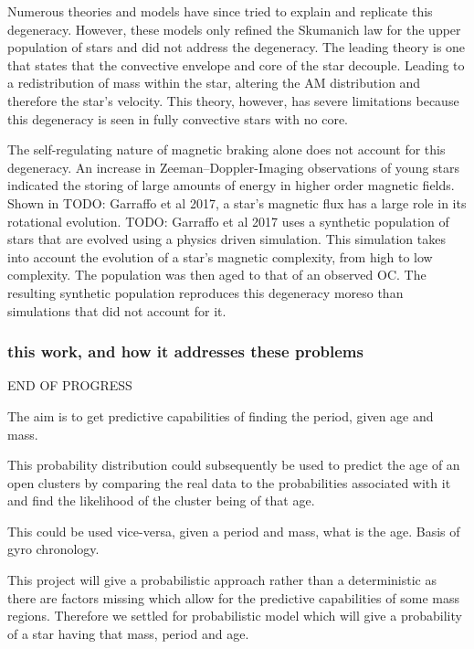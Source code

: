 \documentclass[fleqn,usenatbib]{mnras}
\begin{document}
Numerous theories and models have since tried to explain and replicate this degeneracy.
However, these models only refined the Skumanich law for the upper population of stars and did not address the degeneracy.
The leading theory is one that states that the convective envelope and core of the star decouple.
Leading to a redistribution of mass within the star, altering the AM distribution and therefore the star’s velocity.
This theory, however, has severe limitations because this degeneracy is seen in fully convective stars with no core. 

The self-regulating nature of magnetic braking alone does not account for this degeneracy.
An increase in Zeeman–Doppler-Imaging observations of young stars indicated the storing of large amounts of energy in higher order magnetic fields.
Shown in TODO: Garraffo et al 2017, a star’s magnetic flux has a large role in its rotational evolution.
TODO: Garraffo et al 2017 uses a synthetic population of stars that are evolved using a physics driven simulation.
This simulation takes into account the evolution of a star’s magnetic complexity, from high to low complexity.
The population was then aged to that of an observed OC.
The resulting synthetic population reproduces this degeneracy moreso than simulations that did not account for it.

\subsubsection{this work, and how it addresses these problems}
END OF PROGRESS

The aim is to get predictive capabilities of finding the period, given age and mass.

This probability distribution could subsequently be used to predict the age of an open clusters by comparing the real data to the probabilities associated with it and find the likelihood of the cluster being of that age.

This could be used vice-versa, given a period and mass, what is the age. Basis of gyro chronology.

This project will give a probabilistic approach rather than a deterministic as there are factors missing which allow for the predictive capabilities of some mass regions. Therefore we settled for probabilistic model which will give a probability of a star having that mass, period and age.
\end{document}
